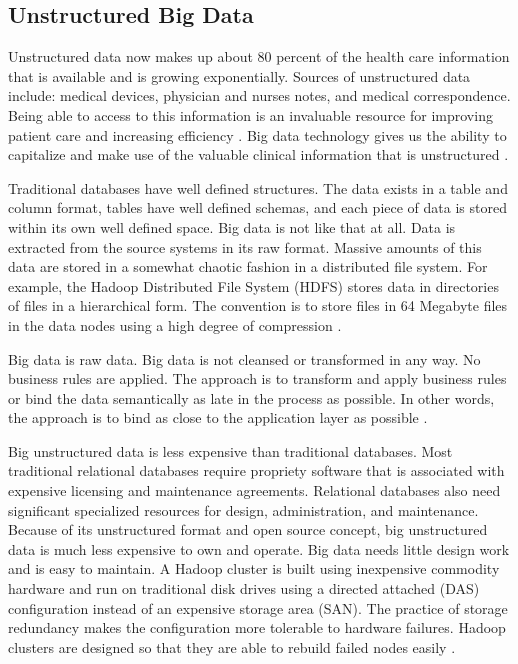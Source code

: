 \documentclass[sigconf]{acmart}
\begin{document}
\subsection{Unstructured Big Data}

Unstructured data now makes up about 80 percent of the health care information that is available and is growing exponentially.  Sources of unstructured data include: medical devices, physician and nurses notes, and medical correspondence.  Being able to access to this information is an invaluable resource for improving patient care and increasing efficiency \cite{www-google-McDonald}.  Big data technology gives us the ability to capitalize and make use of the valuable clinical information that is unstructured \cite{www-google-HlthCat}. 

Traditional databases have well defined structures. The data exists in a table and column format, tables have well defined schemas, and each piece of data is stored within its own well defined space.  Big data is not like that at all.  Data is extracted from the source systems in its raw format.  Massive amounts of this data are stored in a somewhat chaotic fashion in a distributed file system.  For example, the Hadoop Distributed File System (HDFS) stores data in directories of files in a hierarchical form. The convention is to store files in 64 Megabyte files in the data nodes using a high degree of compression \cite{www-google-HlthCat}. 

Big data is raw data. Big data is not cleansed or transformed in any way. No business rules are applied. The approach is to transform and apply business rules or bind the data semantically as late in the process as possible.  In other words, the approach is to bind as close to the application layer as possible \cite{www-google-HlthCat}.

Big unstructured data is less expensive than traditional databases. Most traditional relational databases require propriety software that is associated with expensive licensing and maintenance agreements.  Relational databases also need significant specialized resources for design, administration, and maintenance. Because of its unstructured format and open source concept, big unstructured data is much less expensive to own and operate. Big data needs little design work and is easy to maintain. A Hadoop cluster is built using inexpensive commodity hardware and run on traditional disk drives using a directed attached (DAS) configuration instead of an expensive storage area (SAN).  The practice of storage redundancy makes the configuration more tolerable to hardware failures.  Hadoop clusters are designed so that they are able to rebuild failed nodes easily \cite{www-google-HlthCat}.  
\end{document}
